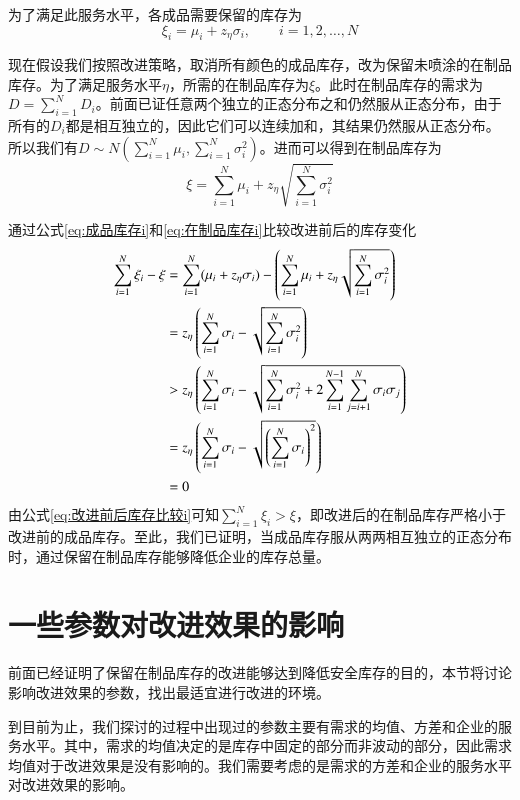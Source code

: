 为了满足此服务水平，各成品需要保留的库存为
\begin{equation}
\xi_i = \mu_i + z_\eta\sigma_i,\qquad i=1,2,\ldots,N
\label{eq:成品库存i}
\end{equation}

现在假设我们按照改进策略，取消所有颜色的成品库存，改为保留未喷涂的在制品库存。为了满足服务水平$\eta$，所需的在制品库存为$\xi$。此时在制品库存的需求为$D=\sum_{i=1}^ND_i$。前面已证任意两个独立的正态分布之和仍然服从正态分布，由于所有的$D_i$都是相互独立的，因此它们可以连续加和，其结果仍然服从正态分布。所以我们有$D\sim N(\sum_{i=1}^N\mu_i,\sum_{i=1}^N\sigma_i^2)$。进而可以得到在制品库存为
\begin{equation}
\xi = \sum_{i=1}^N\mu_i + z_\eta\sqrt{\sum_{i=1}^N\sigma_i^2}
\label{eq:在制品库存i}
\end{equation}

通过公式\ref{eq:成品库存i}和\ref{eq:在制品库存i}比较改进前后的库存变化
\begin{align}
\sum_{i=1}^N\xi_i - \xi &= \sum_{i=1}^N (\mu_i+z_\eta\sigma_i) - \left(\sum_{i=1}^N\mu_i + z_\eta\sqrt{\sum_{i=1}^N\sigma_i^2}\right) \notag\\
&= z_\eta\left(\sum_{i=1}^N\sigma_i-\sqrt{\sum_{i=1}^N\sigma_i^2}\right) \notag\\
&> z_\eta\left(\sum_{i=1}^N\sigma_i-\sqrt{\sum_{i=1}^N\sigma_i^2+2\sum_{i=1}^{N-1}\sum_{j=i+1}^N\sigma_i\sigma_j}\right) \notag\\
&= z_\eta\left(\sum_{i=1}^N\sigma_i-\sqrt{\left(\sum_{i=1}^N\sigma_i\right)^2}\right) \notag\\
&= 0
\label{eq:改进前后库存比较i}
\end{align}
由公式\ref{eq:改进前后库存比较i}可知$\sum_{i=1}^N\xi_i > \xi$，即改进后的在制品库存严格小于改进前的成品库存。至此，我们已证明，当成品库存服从两两相互独立的正态分布时，通过保留在制品库存能够降低企业的库存总量。








\section{一些参数对改进效果的影响}

前面已经证明了保留在制品库存的改进能够达到降低安全库存的目的，本节将讨论影响改进效果的参数，找出最适宜进行改进的环境。

到目前为止，我们探讨的过程中出现过的参数主要有需求的均值、方差和企业的服务水平。其中，需求的均值决定的是库存中固定的部分而非波动的部分，因此需求均值对于改进效果是没有影响的。我们需要考虑的是需求的方差和企业的服务水平对改进效果的影响。

